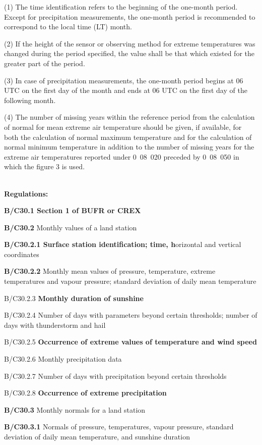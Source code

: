 (1) The time identification refers to the beginning of the one-month period. Except for precipitation measurements, the one-month period is recommended to correspond to the local time (LT) month.

(2) If the height of the sensor or observing method for extreme temperatures was changed during the period specified, the value shall be that which existed for the greater part of the period.

(3) In case of precipitation measurements, the one-month period begins at 06 UTC on the first day of the month and ends at 06 UTC on the first day of the following month.

(4) The number of missing years within the reference period from the calculation of normal for mean extreme air temperature should be given, if available, for both the calculation of normal maximum temperature and for the calculation of normal minimum temperature in addition to the number of missing years for the extreme air temperatures reported under 0~08~020 preceded by 0~08~050 in which the figure 3 is used.

\textbf{\\
Regulations:}

\textbf{B/C30.1 Section 1 of BUFR or CREX}

\textbf{B/C30.2} Monthly values of a land station

\textbf{B/C30.2.1 Surface station identification; time, h}orizontal and vertical coordinates

\textbf{B/C30.2.2} Monthly mean values of pressure, temperature, extreme temperatures and vapour pressure; standard deviation of daily mean temperature

B/C30.2.3 \textbf{Monthly duration of sunshine}

B/C30.2.4 Number of days with parameters beyond certain thresholds; number of days with thunderstorm and hail

B/C30.2.5 \textbf{Occurrence of extreme values of temperature and wind speed}

B/C30.2.6 Monthly precipitation data

B/C30.2.7 Number of days with precipitation beyond certain thresholds

B/C30.2.8 \textbf{Occurrence of extreme precipitation}

\textbf{B/C30.3} Monthly normals for a land station

\textbf{B/C30.3.1} Normals of pressure, temperatures, vapour pressure, standard deviation of daily mean temperature, and sunshine duration

